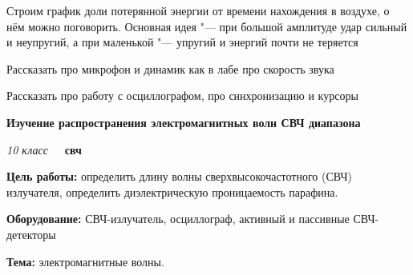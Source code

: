\documentclass[a4paper,10pt]{article}
\newcommand{\labtitle}[7]{
	\textbf{#2}\par
	\textit{#1 класс}~~~\textbf{#3}\par
	\textbf{Цель работы:} #4\par
	\textbf{Оборудование:} #5\par
	\textbf{Тема:} #6
}
\begin{document}
\begin{enumerate}
{		\item Строим график доли потерянной энергии от времени нахождения в воздухе, о нём можно поговорить. Основная идея "--- при большой амплитуде удар сильный и неупругий, а при маленькой "--- упругий и энергий почти не теряется
		\item Рассказать про микрофон и динамик как в лабе про скорость звука
		\item Рассказать про работу с осциллографом, про синхронизацию и курсоры}
	\item \labtitle
		{10}
		{Изучение распространения электромагнитных волн СВЧ диапазона}
		{свч}
		{определить длину волны сверхвысокочастотного (СВЧ) излучателя, определить диэлектрическую проницаемость парафина.}
		{СВЧ-излучатель, осциллограф, активный и пассивные СВЧ-детекторы}
		{электромагнитные волны.}
		{\item Рассказываем про уравнение плоской скалярной волны $U(x, t) = A \cos(\omega t - kx)$. Выясняем, что такая волна бежит в положительную сторону по $x$.
		\item Рассказываем про электромагнитные волны, вектора $\vec E$ и $\vec B$, поляризацию. Рассказываем, что ЭМВ бывают разной частоты, разницу между радиоволной и светом.
		\item Как принимаются радиоволны. Как волна воздействует на антенну. Как сделать детектор? (поставить диод в разрез антенны)
		\item Что будет, если навстречу летят две плоские волны (будет стоячая волна). А что, если разной амплитуды?
		\item Переходим к установке. Источник излучает модулированную прямоугольником порядка 1\,кГц волну. Показываем поляризацию, отражение от пластины, стоячую волну
		\item Если хватает времени, устанавливаем парафиновую призму и смотрим, как она преломляет, находим коэффициент преломления
		\item Обеспечиваем передоз знаниями}
\end{enumerate}
\end{document}
